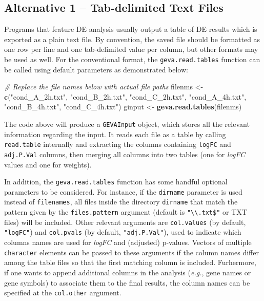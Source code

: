 \documentclass[
  12pt,
]{article}
\newenvironment{Shaded}{\begin{snugshade}}{\end{snugshade}}
\newcommand{\CommentTok}[1]{\textcolor[rgb]{0.56,0.35,0.01}{\textit{#1}}}
\newcommand{\KeywordTok}[1]{\textcolor[rgb]{0.13,0.29,0.53}{\textbf{#1}}}
\newcommand{\NormalTok}[1]{#1}
\newcommand{\StringTok}[1]{\textcolor[rgb]{0.31,0.60,0.02}{#1}}
\begin{document}
\hypertarget{alternative-1-tab-delimited-text-files}{%
\subsection{Alternative 1 -- Tab-delimited Text
Files}\label{alternative-1-tab-delimited-text-files}}

Programs that feature DE analysis usually output a table of DE results
which is exported as a plain text file. By convention, the saved file
should be formatted as one row per line and one tab-delimited value per
column, but other formats may be used as well. For the conventional
format, the \texttt{geva.read.tables} function can be called using
default parameters as demonstrated below:

\begin{Shaded}
\begin{Highlighting}[]
\CommentTok{# Replace the file names below with actual file paths}
\NormalTok{filenms <-}\StringTok{ }\KeywordTok{c}\NormalTok{(}\StringTok{"cond_A_2h.txt"}\NormalTok{, }\StringTok{"cond_B_2h.txt"}\NormalTok{, }\StringTok{"cond_C_2h.txt"}\NormalTok{,}
             \StringTok{"cond_A_4h.txt"}\NormalTok{, }\StringTok{"cond_B_4h.txt"}\NormalTok{, }\StringTok{"cond_C_4h.txt"}\NormalTok{)}
\NormalTok{ginput <-}\StringTok{ }\KeywordTok{geva.read.tables}\NormalTok{(filenms)}
\end{Highlighting}
\end{Shaded}

The code above will produce a \texttt{GEVAInput} object, which stores
all the relevant information regarding the input. It reads each file as
a table by calling \texttt{read.table} internally and extracting the
columns containing \texttt{logFC} and \texttt{adj.P.Val} columns, then
merging all columns into two tables (one for \emph{logFC} values and one
for weights).

In addition, the \texttt{geva.read.tables} function has some handful
optional parameters to be considered. For instance, if the
\texttt{dirname} parameter is used instead of \texttt{filenames}, all
files inside the directory \texttt{dirname} that match the pattern given
by the \texttt{files.pattern} argument (default is
\texttt{"\textbackslash{}\textbackslash{}.txt\$"} or TXT files) will be
included. Other relevant arguments are \texttt{col.values} (by default,
\texttt{"logFC"}) and \texttt{col.pvals} (by default,
\texttt{"adj.P.Val"}), used to indicate which columns names are used for
\emph{logFC} and (adjusted) p-values. Vectors of multiple
\texttt{character} elements can be passed to these arguments if the
column names differ among the table files so that the first matching
column is included. Furhermore, if one wants to append additional
columns in the analysis (\emph{e.g.}, gene names or gene symbols) to
associate them to the final results, the column names can be specified
at the \texttt{col.other} argument.
\end{document}
